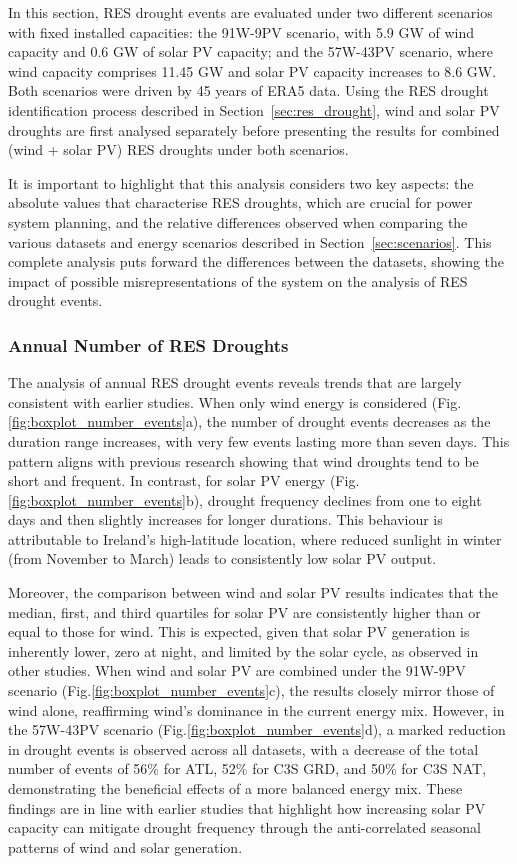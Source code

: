 \documentclass[preprint, 12pt]{elsarticle}
\begin{document}
In this section, RES drought events are evaluated under two different scenarios with fixed installed capacities: the 91W-9PV scenario, with 5.9 GW of wind capacity and 0.6 GW of solar PV capacity; and the 57W-43PV scenario, where wind capacity comprises 11.45 GW and solar PV capacity increases to 8.6 GW. Both scenarios were driven by 45 years of ERA5 data. Using the RES drought identification process described in Section~\ref{sec:res_drought}, wind and solar PV droughts are first analysed separately before presenting the results for combined (wind + solar PV) RES droughts under both scenarios.

It is important to highlight that this analysis considers two key aspects: the absolute values that characterise RES droughts, which are crucial for power system planning, and the relative differences observed when comparing the various datasets and energy scenarios described in Section~\ref{sec:scenarios}. This complete analysis puts forward the differences between the datasets, showing the impact of possible misrepresentations of the system on the analysis of RES drought events.

\subsubsection{Annual Number of RES Droughts}

The analysis of annual RES drought events reveals trends that are largely consistent with earlier studies. When only wind energy is considered (Fig.\ref{fig:boxplot_number_events}a), the number of drought events decreases as the duration range increases, with very few events lasting more than seven days. This pattern aligns with previous research showing that wind droughts tend to be short and frequent. In contrast, for solar PV energy (Fig.\ref{fig:boxplot_number_events}b), drought frequency declines from one to eight days and then slightly increases for longer durations. This behaviour is attributable to Ireland's high-latitude location, where reduced sunlight in winter (from November to March) leads to consistently low solar PV output.

Moreover, the comparison between wind and solar PV results indicates that the median, first, and third quartiles for solar PV are consistently higher than or equal to those for wind. This is expected, given that solar PV generation is inherently lower, zero at night, and limited by the solar cycle, as observed in other studies. When wind and solar PV are combined under the 91W-9PV scenario (Fig.\ref{fig:boxplot_number_events}c), the results closely mirror those of wind alone, reaffirming wind’s dominance in the current energy mix. However, in the 57W-43PV scenario (Fig.\ref{fig:boxplot_number_events}d), a marked reduction in drought events is observed across all datasets, with a decrease of the total number of events of 56\% for ATL, 52\% for C3S GRD, and 50\% for C3S NAT, demonstrating the beneficial effects of a more balanced energy mix. These findings are in line with earlier studies that highlight how increasing solar PV capacity can mitigate drought frequency through the anti-correlated seasonal patterns of wind and solar generation.
\end{document}
